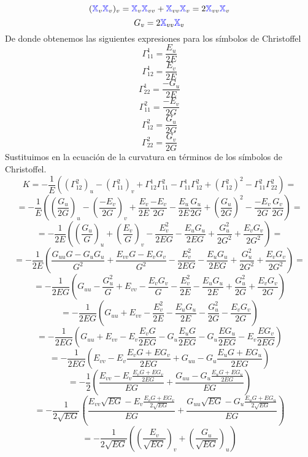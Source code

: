 \documentclass{article}
\newcommand{\bb}[1]{\mathbb{#1}}
\begin{document}
$$
(\textcolor{blue}{\bb{X}}_v\textcolor{blue}{\bb{X}}_v)_v = \textcolor{blue}{\bb{X}}_v \textcolor{blue}{\bb{X}}_{vv} + \textcolor{blue}{\bb{X}}_{vv} \textcolor{blue}{\bb{X}}_v =
2 \textcolor{blue}{\bb{X}}_{vv}\textcolor{blue}{\bb{X}}_v
$$
$$
G_v = 2 \textcolor{blue}{\bb{X}}_{vv}\textcolor{blue}{\bb{X}}_v
$$
De donde obtenemos las siguientes expresiones para los símbolos de Christoffel
$$
\Gamma_{11}^1 = \frac{E_u}{2E}
$$
$$
\Gamma_{12}^1 = \frac{E_v}{2E}
$$
$$
\Gamma_{22}^1 = \frac{-G_u}{2E}
$$
$$
\Gamma_{11}^2 = \frac{-E_v}{2G}
$$
$$
\Gamma_{12}^2 = \frac{G_u}{2G}
$$
$$
\Gamma_{22}^2 = \frac{G_v}{2G}
$$
Sustituimos en la ecuación de la curvatura en términos de los símbolos de Christoffel.
$$
K = - \frac{1}{E} \left( \left( \Gamma_{12}^2 \right)_u - \left( \Gamma_{11}^2 \right)_v + \Gamma_{12}^1\Gamma_{11}^2 - \Gamma_{11}^1\Gamma_{12}^2 + \left( \Gamma_{12}^2 \right)^2 - \Gamma_{11}^2\Gamma_{22}^2 \right) =
$$
$$
= - \frac{1}{E} \left( \left( \frac{G_u}{2G} \right)_u - \left(\frac{-E_v}{2G} \right)_v + \frac{E_v}{2E}\frac{-E_v}{2G} - \frac{E_u}{2E}\frac{G_u}{2G} + \left( \frac{G_u}{2G} \right)^2 - \frac{-E_v}{2G}\frac{G_v}{2G} \right) =
$$
$$
= - \frac{1}{2E} \left( \left( \frac{G_u}{G} \right)_u + \left(\frac{E_v}{G} \right)_v - \frac{E_v^2}{2EG} - \frac{E_uG_u}{2EG} + \frac{G_u^2}{2G^2} + \frac{E_vG_v}{2G^2} \right) =
$$
$$
= - \frac{1}{2E} \left( \frac{G_{uu}G-G_uG_u}{G^2} + \frac{E_{vv}G-E_vG_v}{G^2} - \frac{E_v^2}{2EG} - \frac{E_uG_u}{2EG} + \frac{G_u^2}{2G^2} + \frac{E_vG_v}{2G^2} \right) =
$$
$$
= - \frac{1}{2EG} \left( G_{uu}-\frac{G_u^2}{G} + E_{vv} - \frac{E_vG_v}{G} - \frac{E_v^2}{2E} - \frac{E_uG_u}{2E} + \frac{G_u^2}{2G} + \frac{E_vG_v}{2G} \right)
$$
$$
= - \frac{1}{2EG} \left( G_{uu} + E_{vv} - \frac{E_v^2}{2E} - \frac{E_uG_u}{2E} - \frac{G_u^2}{2G} - \frac{E_vG_v}{2G} \right)
$$
$$
= - \frac{1}{2EG} \left( G_{uu} + E_{vv} - E_v\frac{E_vG}{2EG} - G_u\frac{E_uG}{2EG} - G_u\frac{EG_u}{2EG} - E_v\frac{EG_v}{2EG} \right)
$$
$$
= - \frac{1}{2EG}\left( E_{vv} - E_v \frac{E_vG+EG_v}{2EG} + G_{uu}- G_u \frac{E_uG+EG_u}{2EG} \right)
$$
$$
= - \frac{1}{2}\left( \frac{E_{vv} - E_v \frac{E_vG+EG_v}{2EG}}{EG} + \frac{G_{uu}- G_u \frac{E_uG+EG_u}{2EG}}{EG} \right)
$$
$$
= - \frac{1}{2\sqrt{EG}}\left( \frac{E_{vv}\sqrt{EG} - E_v \frac{E_vG+EG_v}{2\sqrt{EG}}}{EG} + \frac{G_{uu}\sqrt{EG}- G_u \frac{E_uG+EG_u}{2\sqrt{EG}}}{EG} \right)
$$
$$
= - \frac{1}{2\sqrt{EG}}\left( \left(\frac{E_v}{\sqrt{EG}}\right)_v + \left(\frac{G_u}{\sqrt{EG}}\right)_u \right)
$$
\end{document}
